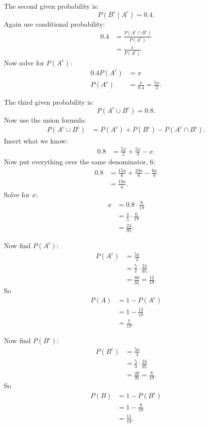 \documentclass[11pt,a4paper]{article}
\begin{document}
The second given probability is:
\[
P(B^c\mid A^c)=0.4.
\]
Again use conditional probability:
\begin{align*}
0.4
&=\frac{P(A^c\cap B^c)}{P(A^c)}\\
&=\frac{x}{P(A^c)}.
\end{align*}
Now solve for \(P(A^c)\):
\begin{align*}
0.4P(A^c)&=x\\
P(A^c)&=\frac{x}{0.4}
=\frac{5x}{2}.
\end{align*}

The third given probability is:
\[
P(A^c\cup B^c)=0.8.
\]
Now use the union formula:
\begin{align*}
P(A^c\cup B^c)
&=P(A^c)+P(B^c)-P(A^c\cap B^c).
\end{align*}
Insert what we know:
\begin{align*}
0.8
&=\frac{5x}{2}+\frac{5x}{3}-x.
\end{align*}
Now put everything over the same denominator, \(6\):
\begin{align*}
0.8
&=\frac{15x}{6}+\frac{10x}{6}-\frac{6x}{6}\\
&=\frac{19x}{6}.
\end{align*}
Solve for \(x\):
\begin{align*}
x
&=0.8\cdot \frac{6}{19}\\
&=\frac{4}{5}\cdot \frac{6}{19}\\
&=\frac{24}{95}.
\end{align*}

Now find \(P(A^c)\):
\begin{align*}
P(A^c)
&=\frac{5x}{2}\\
&=\frac{5}{2}\cdot \frac{24}{95}\\
&=\frac{60}{95}
=\frac{12}{19}.
\end{align*}
So
\begin{align*}
P(A)
&=1-P(A^c)\\
&=1-\frac{12}{19}\\
&=\frac{7}{19}.
\end{align*}

Now find \(P(B^c)\):
\begin{align*}
P(B^c)
&=\frac{5x}{3}\\
&=\frac{5}{3}\cdot \frac{24}{95}\\
&=\frac{40}{95}
=\frac{8}{19}.
\end{align*}
So
\begin{align*}
P(B)
&=1-P(B^c)\\
&=1-\frac{8}{19}\\
&=\frac{11}{19}.
\end{align*}
\end{document}

